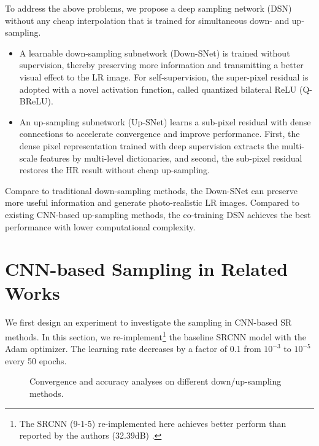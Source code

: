 \documentclass[runningheads]{llncs}
\begin{document}
To address the above problems, we propose a deep sampling network (DSN) without any cheap interpolation that is trained for simultaneous down- and up-sampling.
\begin{itemize}
  \item A learnable down-sampling subnetwork (Down-SNet) is trained without supervision, thereby preserving more information and transmitting a better visual effect to the LR image. For self-supervision, the super-pixel residual is adopted with a novel activation function, called quantized bilateral ReLU (Q-BReLU).
  \item An up-sampling subnetwork (Up-SNet) learns a sub-pixel residual with dense connections to accelerate convergence and improve performance. First, the dense pixel representation trained with deep supervision extracts the multi-scale features by multi-level dictionaries, and second, the sub-pixel residual restores the HR result without cheap up-sampling.
\end{itemize}
Compare to traditional down-sampling methods, the Down-SNet can preserve more useful information and generate photo-realistic LR images. Compared to existing CNN-based up-sampling methods, the co-training DSN achieves the best performance with lower computational complexity. %

\section{CNN-based Sampling in Related Works}
We first design an experiment to investigate the sampling in CNN-based SR methods. In this section, we re-implement\footnote{The SRCNN (9-1-5) re-implemented here achieves better perform than reported by the authors (32.39dB) \cite{srcnn}.} the baseline SRCNN \cite{srcnn} model with the Adam \cite{adam} optimizer. The learning rate decreases by a factor of 0.1 from $10^{-3}$ to $10^{-5}$ every 50 epochs.
\begin{figure}[bth]
\begin{center}
\end{center}
   \caption{Convergence and accuracy analyses on different down/up-sampling methods.}
\label{fig:sample}
\end{figure}
\end{document}
